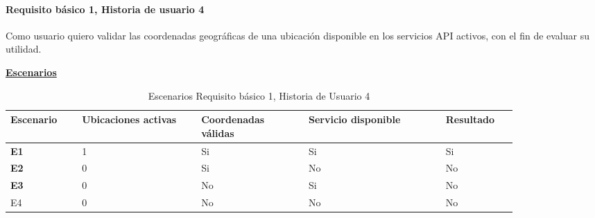 \documentclass[../ei103948-project-documentation.tex]{subfiles}
\begin{document}
				\newpage


				\paragraph{Requisito básico 1, Historia de usuario 4}
				Como usuario quiero validar las coordenadas geográficas de una ubicación disponible en los servicios API activos, con el fin de evaluar su utilidad.

				\begin{center}
				\textbf{\underline{Escenarios}}
				\begin{table}[H]
					\centering
					\begin{tabular}{|p{0.12\linewidth}|p{0.20\linewidth}|p{0.18\linewidth}|p{0.23\linewidth}|p{0.12\linewidth}|}
						\hline
						\textbf{Escenario} & \textbf{Ubicaciones activas} & \textbf{Coordenadas válidas} & \textbf{Servicio disponible} & \textbf{Resultado} \\ \hline
						\textbf{E1}        & 1                        & Si                           & Si                           & Si                 \\ \hline
						\textbf{E2}        & 0                        & Si                           & No                           & No                 \\ \hline
						\textbf{E3}        & 0                        & No                           & Si                           & No                 \\ \hline
						E4                 & 0                        & No                           & No                           & No                 \\ \hline
						\end{tabular}
					\caption{Escenarios Requisito básico 1, Historia de Usuario 4}
				\end{table}

				\descripcionBasicaD



\end{center}
\end{document}
